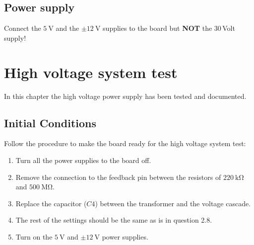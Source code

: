 \documentclass{article}
\begin{document}
\subsection{Power supply}
Connect the $\SI{5}{\volt}$ and the $\pm \SI{12}{\volt}$ supplies to the board but \textbf{NOT} the 30\,Volt supply!










\newpage
\section{High voltage system test}
In this chapter the high voltage power supply has been tested and documented.

\subsection{Initial Conditions}
Follow the procedure to make the board ready for the high voltage system test:
\begin{enumerate}
	\item Turn all the power supplies to the board off.
	\item Remove the connection to the feedback pin between the resistors of $\SI{220}{\kilo\ohm}$ and $\SI{500}{\mega\ohm}$. 
	\item Replace the capacitor ($C4$) between the transformer and the voltage cascade.
	\item The rest of the settings should be the same as is in question 2.8.
	\item Turn on the $\SI{5}{\volt}$ and $\pm\SI{12}{\volt}$ power supplies.
\end{enumerate}






\newpage

\end{document}
